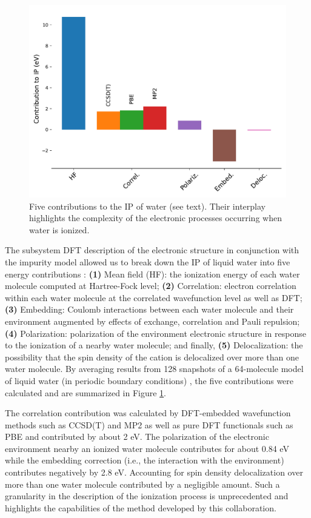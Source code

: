 \documentclass[notitlepage,12pt]{report}
\begin{document}
\begin{figure}
	\includegraphics[width=\linewidth]{./images/contribution_liquidwater_PI}
    \caption{\label{cont_ip}Five contributions to the IP of water (see text). Their interplay highlights the complexity of the electronic processes occurring when water is ionized. \supercite{martinez2022ionization}}
\end{figure}

    The subsystem DFT description of the electronic structure in conjunction with the impurity model allowed us to break down the IP of liquid water  into five energy contributions \supercite{martinez2022ionization}:  {\bf (1)} Mean field (HF): the ionization energy of each water molecule computed at Hartree-Fock level; {\bf (2)} Correlation: electron correlation within each water molecule at the correlated wavefunction level as well as DFT; {\bf (3)} Embedding: Coulomb interactions between each water molecule and their environment augmented by effects of exchange, correlation and Pauli repulsion; {\bf (4)} Polarization: polarization of the environment electronic structure in response to the ionization of a nearby water molecule; and finally, {\bf (5)} Delocalization: the possibility that the spin density of the cation is delocalized over more than one water molecule. By averaging results from  128  snapshots of a 64-molecule model of liquid water (in periodic boundary conditions) \supercite{gaiduk2018electron}, the five contributions were calculated and are summarized in Figure \ref{cont_ip}. 

    The correlation contribution was calculated by DFT-embedded wavefunction methods such as CCSD(T) and MP2 as well as pure DFT functionals such as PBE and contributed by about 2 eV. The polarization of the electronic environment nearby an ionized water molecule contributes for about 0.84 eV while the embedding correction (i.e., the interaction with the environment) contributes negatively by 2.8 eV. Accounting for spin density delocalization over more than one water molecule contributed by a negligible amount. Such a granularity in the description of the ionization process is unprecedented and highlights the capabilities of the method developed by this collaboration. 	
	
\end{document}
